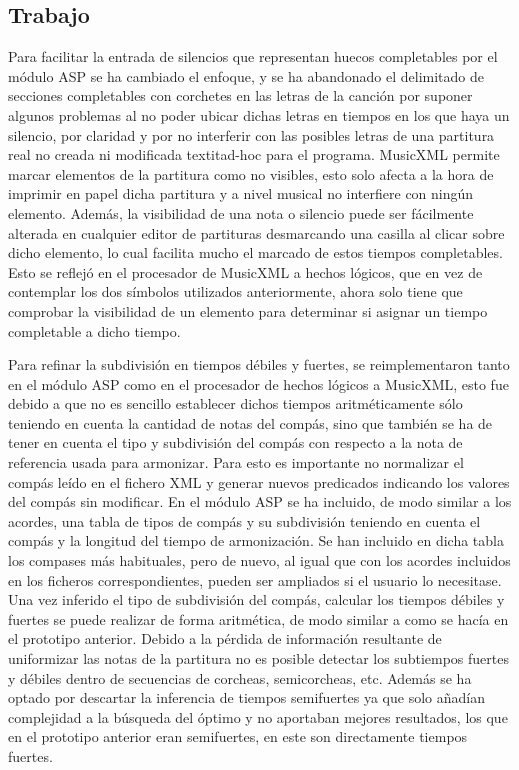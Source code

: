 \subsection{Trabajo}
\label{subsec:sixth_iteration_work}
Para facilitar la entrada de silencios que representan huecos completables por el módulo ASP se ha cambiado el enfoque, y se ha abandonado el delimitado de secciones completables con corchetes en las letras de la canción por suponer algunos problemas al no poder ubicar dichas letras en tiempos en los que haya un silencio, por claridad y por no interferir con las posibles letras de una partitura real no creada ni modificada textit{ad-hoc} para el programa. MusicXML permite marcar elementos de la partitura como no visibles, esto solo afecta a la hora de imprimir en papel dicha partitura y a nivel musical no interfiere con ningún elemento. Además, la visibilidad de una nota o silencio puede ser fácilmente alterada en cualquier editor de partituras desmarcando una casilla al clicar sobre dicho elemento, lo cual facilita mucho el marcado de estos tiempos completables. Esto se reflejó en el procesador de MusicXML a hechos lógicos, que en vez de contemplar los dos símbolos utilizados anteriormente, ahora solo tiene que comprobar la visibilidad de un elemento para determinar si asignar un tiempo completable a dicho tiempo.

Para refinar la subdivisión en tiempos débiles y fuertes, se reimplementaron tanto en el módulo ASP como en el procesador de hechos lógicos a MusicXML, esto fue debido a que no es sencillo establecer dichos tiempos aritméticamente sólo teniendo en cuenta la cantidad de notas del compás, sino que también se ha de tener en cuenta el tipo y subdivisión del compás con respecto a la nota de referencia usada para armonizar. Para esto es importante no normalizar el compás leído en el fichero XML y generar nuevos predicados indicando los valores del compás sin modificar. En el módulo ASP se ha incluido, de modo similar a los acordes, una tabla de tipos de compás y su subdivisión teniendo en cuenta el compás y la longitud del tiempo de armonización. Se han incluido en dicha tabla los compases más habituales, pero de nuevo, al igual que con los acordes incluidos en los ficheros correspondientes, pueden ser ampliados si el usuario lo necesitase. Una vez inferido el tipo de subdivisión del compás, calcular los tiempos débiles y fuertes se puede realizar de forma aritmética, de modo similar a como se hacía en el prototipo anterior. Debido a la pérdida de información resultante de uniformizar las notas de la partitura no es posible detectar los subtiempos fuertes y débiles dentro de secuencias de corcheas, semicorcheas, etc. Además se ha optado por descartar la inferencia de tiempos semifuertes ya que solo añadían complejidad a la búsqueda del óptimo y no aportaban mejores resultados, los que en el prototipo anterior eran semifuertes, en este son directamente tiempos fuertes.

